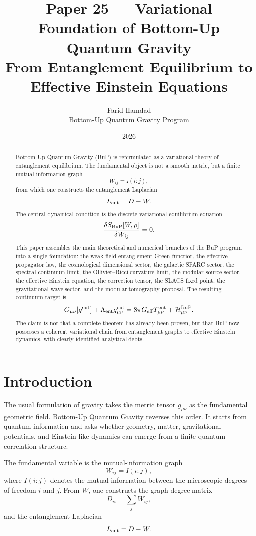\documentclass[11pt,a4paper]{article}
\title{\textbf{Paper 25 --- Variational Foundation of Bottom-Up Quantum Gravity}\\[0.35em]
\large From Entanglement Equilibrium to Effective Einstein Equations}
\author{Farid Hamdad\\
\small Bottom-Up Quantum Gravity Program}
\date{2026}
\begin{document}
\maketitle

\begin{abstract}
Bottom-Up Quantum Gravity (BuP) is reformulated as a variational theory of
entanglement equilibrium. The fundamental object is not a smooth metric, but a
finite mutual-information graph
\[
  W_{ij}=I(i:j),
\]
from which one constructs the entanglement Laplacian
\[
  L_{\rm ent}=D-W.
\]
The central dynamical condition is the discrete variational equilibrium equation
\[
  \frac{\delta S_{\rm BuP}[W,\rho]}{\delta W_{ij}}=0.
\]
This paper assembles the main theoretical and numerical branches of the BuP
program into a single foundation: the weak-field entanglement Green function,
the effective propagator law, the cosmological dimensional sector, the galactic
SPARC sector, the spectral continuum limit, the Ollivier--Ricci curvature
limit, the modular source sector, the effective Einstein equation, the
correction tensor, the SLACS fixed point, the gravitational-wave sector, and
the modular tomography proposal. The resulting continuum target is
\[
G_{\mu\nu}[g^{\rm ent}]
+\Lambda_{\rm ent}g_{\mu\nu}^{\rm ent}
=
8\pi G_{\rm eff}T_{\mu\nu}^{\rm ent}
+\mathcal H_{\mu\nu}^{\rm BuP}.
\]
The claim is not that a complete theorem has already been proven, but that BuP
now possesses a coherent variational chain from entanglement graphs to
effective Einstein dynamics, with clearly identified analytical debts.
\end{abstract}

\tableofcontents

\section{Introduction}

The usual formulation of gravity takes the metric tensor \(g_{\mu\nu}\) as the
fundamental geometric field. Bottom-Up Quantum Gravity reverses this order. It
starts from quantum information and asks whether geometry, matter,
gravitational potentials, and Einstein-like dynamics can emerge from a finite
quantum correlation structure.

The fundamental variable is the mutual-information graph
\begin{equation}
  W_{ij}=I(i:j),
\end{equation}
where \(I(i:j)\) denotes the mutual information between the microscopic degrees
of freedom \(i\) and \(j\). From \(W\), one constructs the graph degree matrix
\begin{equation}
  D_{ii}=\sum_j W_{ij},
\end{equation}
and the entanglement Laplacian
\begin{equation}
  L_{\rm ent}=D-W.
\end{equation}
\end{document}
